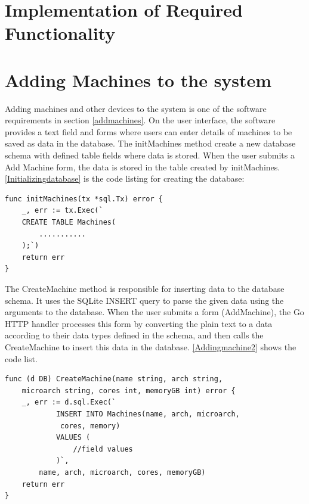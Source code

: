 \section{Implementation of Required Functionality}
\section*{Adding Machines to the system}
Adding machines and other devices to the system is one of the software requirements in section \ref{addmachines}. On the user interface, the software provides a text field and forms where users can enter details of machines to be saved as data in the database. The initMachines method create a new database schema with defined table fields where data is stored. When the user submits a Add Machine form, the data is stored in the table created by initMachines. 
 \autoref{Initializingdatabase} is the code listing for creating the database:
\lstset{basicstyle=\footnotesize\ttfamily,breaklines=true}
\lstset{framextopmargin=50pt,frame=bottomline}
\begin{lstlisting}[caption=Creating table for machine, label=Initializingdatabase]
func initMachines(tx *sql.Tx) error {
	_, err := tx.Exec(`
	CREATE TABLE Machines(
		...........
	);`)
	return err
}
\end{lstlisting}
The CreateMachine method is responsible for inserting data to the database schema. It uses the SQLite INSERT query to parse the given data using the arguments to the database. When the user submits a form (AddMachine), the Go HTTP handler processes this form by converting the plain text to a data according to their data types defined in the schema, and then calls the CreateMachine to insert this data in the database. \autoref{Addingmachine2} shows the code list.
\begin{lstlisting}[caption=Adding machines details, label=Addingmachine2]
func (d DB) CreateMachine(name string, arch string,
	microarch string, cores int, memoryGB int) error {
	_, err := d.sql.Exec(`
			INSERT INTO Machines(name, arch, microarch,
			 cores, memory)
			VALUES (
				//field values
			)`,
		name, arch, microarch, cores, memoryGB)
	return err
}
\end{lstlisting}

